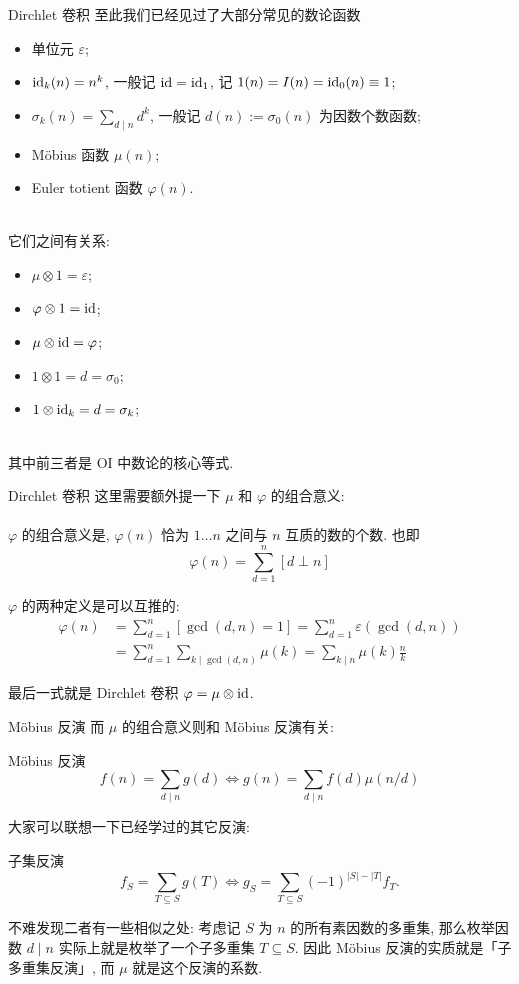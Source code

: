 \documentclass{beamer}
\newcommand{\nl}{\\\hspace*{\fill}\\}
\begin{document}
    \begin{frame}{Dirchlet 卷积}
        至此我们已经见过了大部分常见的数论函数
        \begin{itemize}
            \item 单位元 $\varepsilon$;
            \item ${\rm id}_k(n)=n^k$, 一般记 ${\rm id}={\rm id}_1$, 记 $1(n)=I(n)={\rm id}_0(n)\equiv 1$;
            \item $\sigma_k(n)=\sum_{d\mid n}d^k$, 一般记 $d(n):=\sigma_0(n)$ 为因数个数函数;
            \item M\"obius 函数 $\mu(n)$;
            \item Euler totient 函数 $\varphi(n)$.\nl
        \end{itemize}
        它们之间有关系:
        \begin{itemize}
            \item $\mu\otimes 1=\varepsilon$;
            \item $\varphi\otimes 1={\rm id}$;
            \item $\mu\otimes{\rm id}=\varphi$;
            \item $1\otimes 1=d=\sigma_0$;
            \item $1\otimes{\rm id}_k=d=\sigma_k$;\nl
        \end{itemize}
        其中前三者是 OI 中数论的核心等式.
    \end{frame}
    
    \begin{frame}{Dirchlet 卷积}
        这里需要额外提一下 $\mu$ 和 $\varphi$ 的组合意义:\nl
        $\varphi$ 的组合意义是, $\varphi(n)$ 恰为 $1\dots n$ 之间与 $n$ 互质的数的个数. 也即
        $$
        \varphi(n)=\sum_{d=1}^n[d\perp n]
        $$

        $\varphi$ 的两种定义是可以互推的:
        \begin{align*}
            \varphi(n)&=\sum_{d=1}^n[\gcd(d,n)=1]=\sum_{d=1}^n\varepsilon(\gcd(d,n))\\
            &=\sum_{d=1}^n\sum_{k\mid\gcd(d,n)}\mu(k)=\sum_{k\mid n}\mu(k)\frac nk
        \end{align*}

        最后一式就是 Dirchlet 卷积 $\varphi=\mu\otimes{\rm id}$.
    \end{frame}

    \begin{frame}{M\"obius 反演}
        而 $\mu$ 的组合意义则和 M\"obius 反演有关:
        \begin{block}{M\"obius 反演}
            $$
            f(n)=\sum_{d\mid n}g(d)\iff g(n)=\sum_{d\mid n}f(d)\mu(n/d)
            $$
        \end{block}
        大家可以联想一下已经学过的其它反演:
        \begin{block}{子集反演}
            $$
            f_S=\sum_{T\subseteq S}g(T)\iff g_S=\sum_{T\subseteq S}(-1)^{|S|-|T|}f_T.
            $$
        \end{block}
        不难发现二者有一些相似之处: 考虑记 $S$ 为 $n$ 的所有素因数的多重集, 那么枚举因数 $d\mid n$ 实际上就是枚举了一个子多重集 $T\subseteq S$. 因此 M\"obius 反演的实质就是「子多重集反演」, 而 $\mu$ 就是这个反演的系数.
    \end{frame}
    
\end{document}
